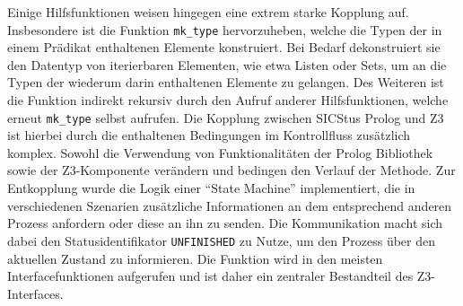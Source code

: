 Einige Hilfsfunktionen weisen hingegen eine extrem starke Kopplung auf.
Insbesondere ist die Funktion \texttt{mk\_type} hervorzuheben, welche die Typen der in einem Prädikat enthaltenen Elemente konstruiert.
Bei Bedarf dekonstruiert sie den Datentyp von iterierbaren Elementen, wie etwa Listen oder Sets, um an die Typen der wiederum darin enthaltenen Elemente zu gelangen.
Des Weiteren ist die Funktion indirekt rekursiv durch den Aufruf anderer Hilfsfunktionen, welche erneut \texttt{mk\_type} selbst aufrufen.
Die Kopplung zwischen SICStus Prolog und Z3 ist hierbei durch die enthaltenen Bedingungen im Kontrollfluss zusätzlich komplex.
Sowohl die Verwendung von Funktionalitäten der Prolog Bibliothek sowie der Z3-Komponente verändern und bedingen den Verlauf der Methode.
Zur Entkopplung wurde die Logik einer \enquote{State Machine} implementiert, die in verschiedenen Szenarien zusätzliche Informationen
an dem entsprechend anderen Prozess anfordern oder diese an ihn zu senden.
Die Kommunikation macht sich dabei den Statusidentifikator \texttt{UNFINISHED} zu Nutze, um den Prozess über den aktuellen Zustand zu informieren.
Die Funktion wird in den meisten Interfacefunktionen aufgerufen und ist daher ein zentraler Bestandteil des Z3-Interfaces.

